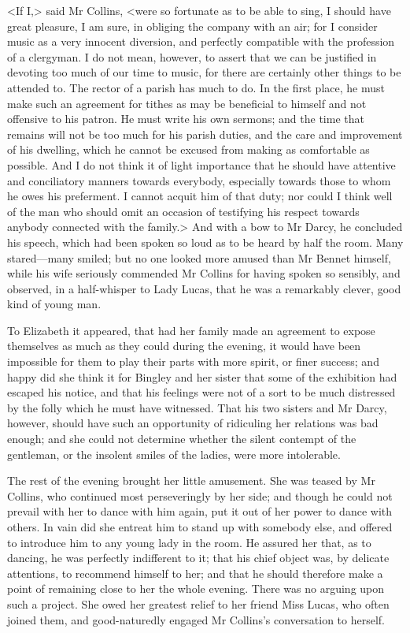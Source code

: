 <If I,> said Mr Collins, <were so fortunate as to be able to sing, I should have great pleasure, I am sure, in obliging the company with an air; for I consider music as a very innocent diversion, and perfectly compatible with the profession of a clergyman. I do not mean, however, to assert that we can be justified in devoting too much of our time to music, for there are certainly other things to be attended to. The rector of a parish has much to do. In the first place, he must make such an agreement for tithes as may be beneficial to himself and not offensive to his patron. He must write his own sermons; and the time that remains will not be too much for his parish duties, and the care and improvement of his dwelling, which he cannot be excused from making as comfortable as possible. And I do not think it of light importance that he should have attentive and conciliatory manners towards everybody, especially towards those to whom he owes his preferment. I cannot acquit him of that duty; nor could I think well of the man who should omit an occasion of testifying his respect towards anybody connected with the family.> And with a bow to Mr Darcy, he concluded his speech, which had been spoken so loud as to be heard by half the room. Many stared—many smiled; but no one looked more amused than Mr Bennet himself, while his wife seriously commended Mr Collins for having spoken so sensibly, and observed, in a half-whisper to Lady Lucas, that he was a remarkably clever, good kind of young man.

To Elizabeth it appeared, that had her family made an agreement to expose themselves as much as they could during the evening, it would have been impossible for them to play their parts with more spirit, or finer success; and happy did she think it for Bingley and her sister that some of the exhibition had escaped his notice, and that his feelings were not of a sort to be much distressed by the folly which he must have witnessed. That his two sisters and Mr Darcy, however, should have such an opportunity of ridiculing her relations was bad enough; and she could not determine whether the silent contempt of the gentleman, or the insolent smiles of the ladies, were more intolerable.

The rest of the evening brought her little amusement. She was teased by Mr Collins, who continued most perseveringly by her side; and though he could not prevail with her to dance with him again, put it out of her power to dance with others. In vain did she entreat him to stand up with somebody else, and offered to introduce him to any young lady in the room. He assured her that, as to dancing, he was perfectly indifferent to it; that his chief object was, by delicate attentions, to recommend himself to her; and that he should therefore make a point of remaining close to her the whole evening. There was no arguing upon such a project. She owed her greatest relief to her friend Miss Lucas, who often joined them, and good-naturedly engaged Mr Collins's conversation to herself.

